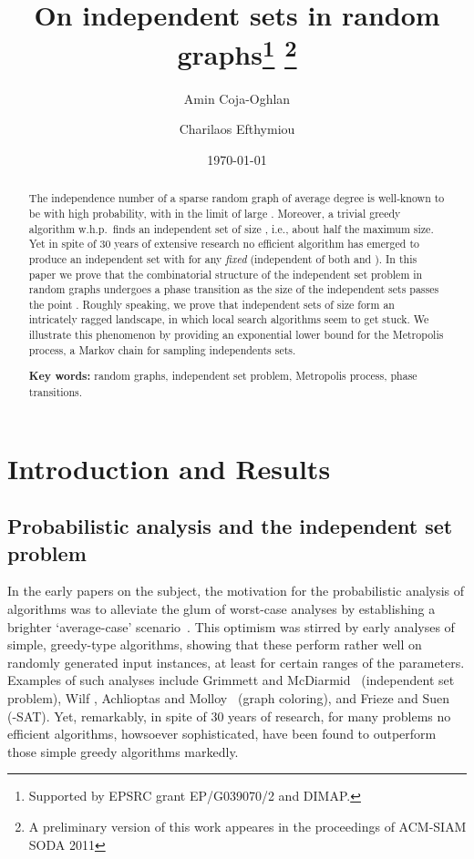 \documentclass[a4paper,10pt]{article}
\date{\today}
\title{\bf On independent sets in random 
graphs\thanks{Supported by EPSRC grant EP/G039070/2 and DIMAP.} 
\thanks{A preliminary version of this work appeares in the proceedings of
ACM-SIAM SODA 2011}}
\author[1]{Amin Coja-Oghlan}
\author[2]{Charilaos Efthymiou}
\affil[1]{Goethe University, Mathematics Dept., Frankfurt 60054, Germany\\
\texttt{acoghlan@math.uni-frankfurt.de}}
\affil[2]{University of Warwick, Mathematics and Computer Science, Coventry CV4 7AL, UK\\
\texttt{c.efthymiou@warwick.ac.uk}}
\newcommand{\whp}{w.h.p.}
\begin{document}
\maketitle
\thispagestyle{empty}




\begin{abstract}
The independence number of a sparse random graph  of average degree  is well-known to be
	 with high probability,
		with  in the limit of large .
Moreover, a trivial greedy algorithm \whp\ finds an independent set of size , i.e.,
about half the maximum size.
Yet in spite of 30 years of extensive research no efficient algorithm has emerged to
produce an independent set with  for any \emph{fixed}  (independent of both  and ).
In this paper we prove that the combinatorial structure of the independent set problem in random
graphs undergoes a phase transition as the size  of the independent sets passes
the point .
Roughly speaking, we prove that independent sets of size  form an 
intricately ragged landscape, in which local search algorithms seem to get stuck.
We illustrate this phenomenon by providing an exponential lower bound for the Metropolis
process, a Markov chain for sampling independents sets.

\medskip
\noindent
{\bf Key words:}
random graphs, independent set problem, Metropolis process, phase transitions.
\end{abstract}

\setcounter{page}{1}
\section{Introduction and Results}
\subsection{Probabilistic analysis  and the independent set problem}

In the early papers on the subject, the motivation for the probabilistic
analysis of algorithms was to alleviate the glum of worst-case
analyses by establishing a brighter `average-case' scenario~\cite{AverAlg1,AverAlg2,AverAlg3}.
This optimism was stirred by early analyses of simple, greedy-type
algorithms, showing that these perform rather well on randomly
generated input instances, at least for certain ranges of the
parameters. Examples of such analyses include Grimmett and
McDiarmid~\cite{grimmett} (independent set problem), Wilf
\cite{Wilf}, Achlioptas and Molloy~\cite{AchListColouring} 
(graph coloring), and Frieze and Suen~\cite{FrSu} (-SAT). Yet, remarkably, in spite of 30
years of research, for many problems no efficient algorithms,
howsoever sophisticated, have been found to outperform those simple
greedy algorithms markedly.
\end{document}
